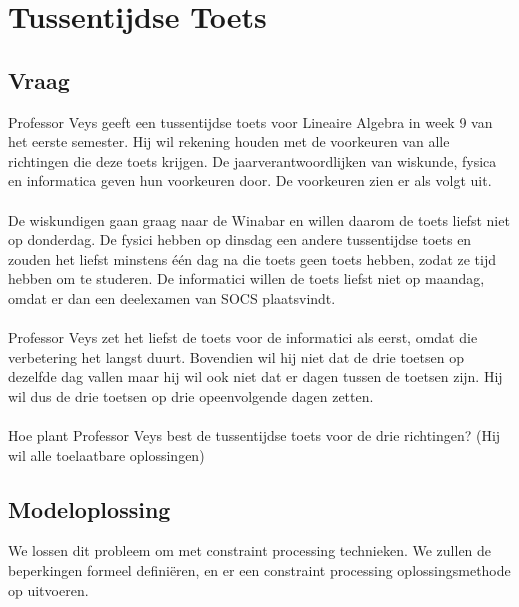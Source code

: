 \documentclass[alternative-exam.tex]{subfiles}
\begin{document}
\chapter{Tussentijdse Toets}

\section{Vraag}
Professor Veys geeft een tussentijdse toets voor Lineaire Algebra in week 9 van het eerste semester.
Hij wil rekening houden met de voorkeuren van alle richtingen die deze toets krijgen. De jaarverantwoordlijken van wiskunde, fysica en informatica geven hun voorkeuren door. De voorkeuren zien er als volgt uit.\\\\
De wiskundigen gaan graag naar de Winabar en willen daarom de toets liefst niet op donderdag. De fysici hebben op dinsdag een andere tussentijdse toets en zouden het liefst minstens \'e\'en dag na die toets geen toets hebben, zodat ze tijd hebben om te studeren. De informatici willen de toets liefst niet op maandag, omdat er dan een deelexamen van SOCS plaatsvindt.\\\\
Professor Veys zet het liefst de toets voor de informatici als eerst, omdat die verbetering het langst duurt. Bovendien wil hij niet dat de drie toetsen op dezelfde dag vallen maar hij wil ook niet dat er dagen tussen de toetsen zijn. Hij wil dus de drie toetsen op drie opeenvolgende dagen zetten.\\\\
Hoe plant Professor Veys best de tussentijdse toets voor de drie richtingen? (Hij wil alle toelaatbare oplossingen)

\section{Modeloplossing}
We lossen dit probleem om met constraint processing technieken. We zullen de beperkingen formeel defini\"eren, en er een constraint processing oplossingsmethode op uitvoeren.
\end{document}
